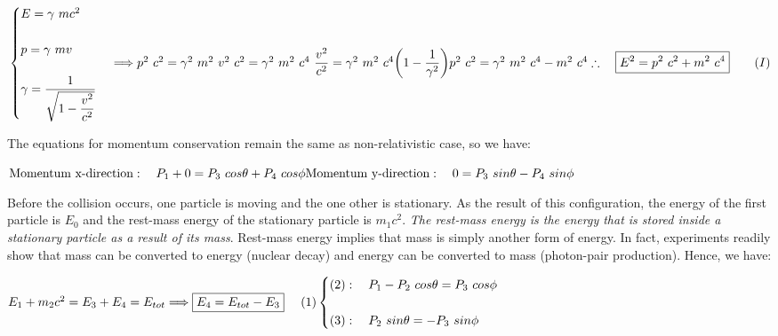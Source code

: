 \documentclass[fleqn]{article}
\begin{document}
$
  \\
  \\
  \begin{cases}
    E=\gamma ~ mc^2
    \\
    \\
    p=\gamma ~ mv
    \\
    \\
    \gamma=\dfrac{1}{\sqrt{1-\dfrac{v^2}{c^2}}}
  \end{cases} \Longrightarrow p^2 ~ c^2=\gamma^2 ~ m^2 ~ v^2 ~ c^2=\gamma^2 ~ m^2 ~ c^4 ~ \dfrac{v^2}{c^2}
  =\gamma^2 ~ m^2 ~ c^4 \bigg( 1-\dfrac{1}{\gamma^2} \bigg)
  \\
  \\
  \\
  p^2 ~ c^2=\gamma^2 ~ m^2 ~ c^4 - m^2 ~ c^4
  \\
  \\
  \\
  \therefore ~~~ \boxed{
    E^2=p^2 ~ c^2+m^2 ~ c^4
  } ~~~~~~ (I)
  \\
  \\
  \\
$

The equations for momentum conservation remain the same as non-relativistic case, so we have:

$
  \\
  \\
  \text{Momentum x-direction}: ~~~ P_1+0=P_3 ~ cos\theta+P_4 ~ cos \phi
  \\
  \\
  \text{Momentum y-direction}: ~~~ 0=P_3 ~ sin\theta -P_4 ~ sin \phi
  \\
  \\
 $

Before the collision occurs, one particle is moving and the one other is stationary. As the result of this 
configuration, the energy of the first particle is $E_0$ and the rest-mass energy of the stationary particle 
is $m_1 c^2$. \emph{The rest-mass energy is the energy that is stored inside a stationary particle as a result of its mass}.
Rest-mass energy implies that mass is simply another form of energy. In fact, experiments readily show that mass 
can be converted to energy (nuclear decay) and energy can be converted to mass (photon-pair production). Hence, we have:

\vspace{10px}

$
  E_1+m_2 c^2=E_3+E_4=E_{tot} \Longrightarrow \boxed{E_4=E_{tot}-E_3} ~~~~ (1)
  \\
  \\
  \begin{cases}
    (2): ~~~ P_1-P_2 ~ cos\theta=P_3 ~ cos \phi
    \\
    \\
    (3): ~~~ P_2 ~ sin\theta =-P_3 ~ sin \phi
  \end{cases}
  \\
  \\
$
\end{document}
